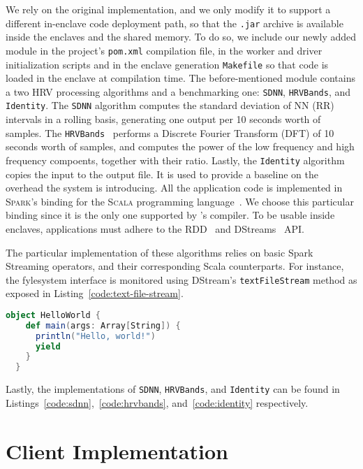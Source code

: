 We rely on the original \sgxspark implementation, and we only modify it to support a different in-enclave code deployment path, so that the \texttt{.jar} archive is available inside the enclaves and the shared memory. 
To do so, we include our newly added module in the project's \texttt{pom.xml} compilation file, in the worker and driver initialization scripts and in the enclave generation \texttt{Makefile} so that code is loaded in the enclave at compilation time.
The before-mentioned module contains a two HRV processing algorithms and a benchmarking one: \texttt{SDNN}, \texttt{HRVBands}, and \texttt{Identity}.
The \texttt{SDNN} algorithm computes the standard deviation of NN (RR) intervals in a rolling basis, generating one output per 10 seconds worth of samples.
The \texttt{HRVBands}~\cite{Shaffer2017} performs a Discrete Fourier Transform (DFT) of 10 seconds worth of samples, and computes the power of the low frequency and high frequency compoents, together with their ratio.
Lastly, the \texttt{Identity} algorithm copies the input to the output file.
It is used to provide a baseline on the overhead the system is introducing.
All the application code is implemented in \textsc{Spark}'s binding for the \textsc{Scala} programming language~\cite{scala-language}. 
We choose this particular binding since it is the only one supported by \sgxspark's compiler.
To be usable inside \sgx enclaves, applications must adhere to the RDD~\cite{rdd-programming-guide} and DStreams~\cite{ZahariaDStreams2012} API.

The particular implementation of these algorithms relies on basic Spark Streaming operators, and their corresponding Scala counterparts.
For instance, the fylesystem interface is monitored using DStream's \texttt{textFileStream} method as exposed in Listing~\ref{code:text-file-stream}.
\begin{lstlisting}[language=Scala,caption={Snippet illustrating \texttt{textFileStream} functionality.},label=code:text-file-stream]
 object HelloWorld {
    def main(args: Array[String]) {
      println("Hello, world!")
      yield
    }
  }
\end{lstlisting}
Lastly, the implementations of \texttt{SDNN}, \texttt{HRVBands}, and \texttt{Identity} can be found in Listings~\ref{code:sdnn},~\ref{code:hrvbands}, and~\ref{code:identity} respectively.

\section{Client Implementation} \label{sec:client-implementation}

